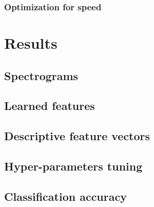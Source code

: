 \documentclass[a4paper,12pt,twoside]{report}
\begin{document}
\subsection{Optimization for speed}

\chapter{Results}
\label{results}

\section{Spectrograms}

\section{Learned features}

\section{Descriptive feature vectors}

\section{Hyper-parameters tuning}

\section{Classification accuracy}
\end{document}
